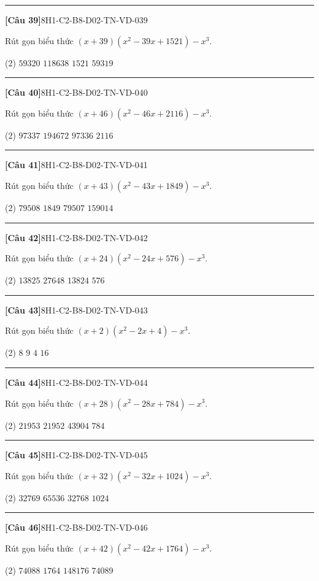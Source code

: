 \documentclass[12pt,a4paper]{article}
\newif\ifloigiai
\newenvironment{cauhoi}[2]{%
  \par\medskip\noindent\rule{\textwidth}{0.4pt}\par\nopagebreak
  \noindent\textbf{[#1]}\hfill{\scriptsize\ttfamily #2}\par\nopagebreak\smallskip}{\par}
\newcommand{\dapan}[1]{\ifloigiai\par\smallskip\noindent\textit{Đáp án:} \textbf{#1}\par\fi}
\begin{document}
\begin{cauhoi}{Câu 39}{8H1-C2-B8-D02-TN-VD-039}
Rút gọn biểu thức $(x+39)(x^{2}-39x+1521)-x^{3}$.
\begin{tasks}(2)
\task $59320$
\task $118638$
\task $1521$
\task $59319$
\end{tasks}
\dapan{D}
\end{cauhoi}
\begin{cauhoi}{Câu 40}{8H1-C2-B8-D02-TN-VD-040}
Rút gọn biểu thức $(x+46)(x^{2}-46x+2116)-x^{3}$.
\begin{tasks}(2)
\task $97337$
\task $194672$
\task $97336$
\task $2116$
\end{tasks}
\dapan{C}
\end{cauhoi}
\begin{cauhoi}{Câu 41}{8H1-C2-B8-D02-TN-VD-041}
Rút gọn biểu thức $(x+43)(x^{2}-43x+1849)-x^{3}$.
\begin{tasks}(2)
\task $79508$
\task $1849$
\task $79507$
\task $159014$
\end{tasks}
\dapan{C}
\end{cauhoi}
\begin{cauhoi}{Câu 42}{8H1-C2-B8-D02-TN-VD-042}
Rút gọn biểu thức $(x+24)(x^{2}-24x+576)-x^{3}$.
\begin{tasks}(2)
\task $13825$
\task $27648$
\task $13824$
\task $576$
\end{tasks}
\dapan{C}
\end{cauhoi}
\begin{cauhoi}{Câu 43}{8H1-C2-B8-D02-TN-VD-043}
Rút gọn biểu thức $(x+2)(x^{2}-2x+4)-x^{3}$.
\begin{tasks}(2)
\task $8$
\task $9$
\task $4$
\task $16$
\end{tasks}
\dapan{A}
\end{cauhoi}
\begin{cauhoi}{Câu 44}{8H1-C2-B8-D02-TN-VD-044}
Rút gọn biểu thức $(x+28)(x^{2}-28x+784)-x^{3}$.
\begin{tasks}(2)
\task $21953$
\task $21952$
\task $43904$
\task $784$
\end{tasks}
\dapan{B}
\end{cauhoi}
\begin{cauhoi}{Câu 45}{8H1-C2-B8-D02-TN-VD-045}
Rút gọn biểu thức $(x+32)(x^{2}-32x+1024)-x^{3}$.
\begin{tasks}(2)
\task $32769$
\task $65536$
\task $32768$
\task $1024$
\end{tasks}
\dapan{C}
\end{cauhoi}
\begin{cauhoi}{Câu 46}{8H1-C2-B8-D02-TN-VD-046}
Rút gọn biểu thức $(x+42)(x^{2}-42x+1764)-x^{3}$.
\begin{tasks}(2)
\task $74088$
\task $1764$
\task $148176$
\task $74089$
\end{tasks}
\dapan{A}
\end{cauhoi}
\end{document}
